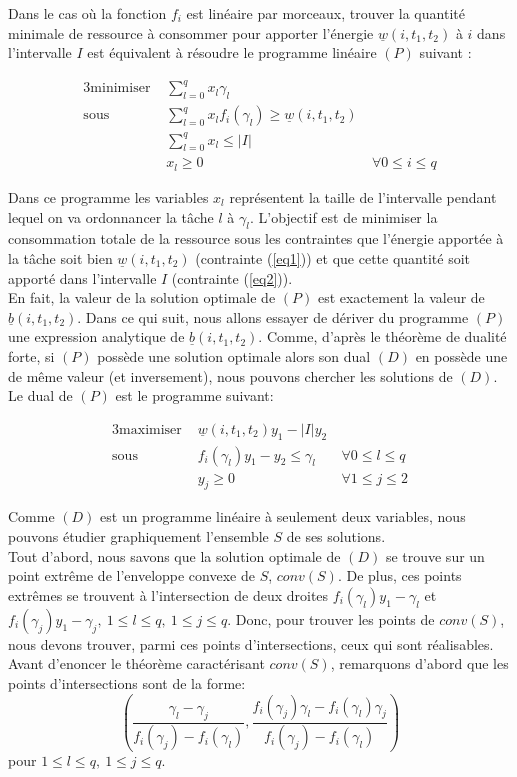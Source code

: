 \documentclass{report}
\newcommand{\bb}{\underline{b}(i,t_1,t_2)}
\newcommand{\wb}{\underline{w}(i,t_1,t_2)}
\newcommand{\ga}{\gamma}
\begin{document}
Dans le cas où la fonction $f_i$ est linéaire par morceaux, trouver la quantité minimale de ressource à consommer pour apporter l'énergie $\wb$ à $i$ dans l'intervalle $I$ est équivalent à résoudre le programme linéaire $(P)$ suivant :


\begin{alignat}{3}
	\text{minimiser  }   & \sum\limits_{l=0}^q x_l\ga_l & \\
	\text{sous  } & \sum\limits_{l=0}^q x_lf_i(\ga_l) \ge \wb & \label{eq1}\\
	& \sum\limits_{l=0}^q x_l \le |I|& \label{eq2}\\
	& x_l \ge 0 & \ \forall 0\le i \le q
\end{alignat}

Dans ce programme les variables $x_l$ représentent la taille de l'intervalle pendant lequel on va ordonnancer la tâche $l$ à $\ga_l$. L'objectif est de minimiser la consommation  totale de la ressource sous les contraintes que l'énergie apportée à la tâche soit bien $\wb$ (contrainte (\ref{eq1})) et que cette quantité soit apporté dans l'intervalle $I$ (contrainte (\ref{eq2})).\\

En fait, la valeur de la solution optimale de $(P)$ est exactement la valeur de $\bb$. Dans ce qui suit, nous allons essayer de dériver du programme $(P)$ une expression analytique de $\bb$. Comme, d'après le théorème de dualité forte, si $(P)$ possède une solution optimale alors son dual $(D)$ en possède une de même valeur (et inversement), nous pouvons chercher les solutions de $(D)$.\\
Le dual de $(P)$ est le programme suivant:

\begin{alignat*}{3}
	\text{maximiser  }   & \wb y_1-|I|y_2 & \\
	\text{sous  } & f_i(\ga_l)y_1 - y_2 \le \ga_l &\ \forall 0\le l \le q\\
	& y_j \ge 0 & \ \forall 1 \le j \le 2
\end{alignat*}

Comme $(D)$ est un programme linéaire à seulement deux variables, nous pouvons 
étudier graphiquement l'ensemble $S$ de ses solutions.\\

Tout d'abord, nous savons que la solution optimale de $(D)$ se trouve sur un point extrême de l'enveloppe convexe de $S$, $conv(S)$. De plus, ces points extrêmes se trouvent à l'intersection de deux droites $f_i(\ga_l)y_1-\ga_l$ et $f_i(\ga_j)y_1-\ga_j,\ 1\le l \le q,\ 1 \le j \le q$. Donc, pour trouver les points de $conv(S)$, nous devons trouver, parmi ces points d'intersections, ceux qui sont réalisables.\\
Avant d'enoncer le théorème caractérisant $conv(S)$, remarquons d'abord que les points d'intersections sont de la forme: 	
\[
\left(
	\frac{\ga_l - \ga_{j}}{f_i(\ga_j)-f_i(\ga_{l})},
	\frac{f_i(\ga_j)\ga_{l} - f_i(\ga_{l})\ga_j}
	{f_i(\ga_j)-f_i(\ga_{l})}
	\right)
\]
pour $1\le l \le q,\ 1 \le j \le q$.\\
\end{document}
